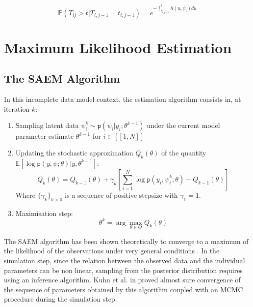 \documentclass[a4paper]{article}
\theoremstyle{plain}
\newcommand{\dens}{\texttt{p}}
\theoremstyle{plain}
\theoremstyle{definition}
\begin{document}
\begin{equation}
\mathbb{P}(T_{ij} > t|T_{i,j-1}=t_{i,j-1}) = e^{-\int_{t_{i,j-1}}^{t}h(u, \psi_i)du}
\end{equation}

\section{Maximum Likelihood Estimation}
\subsection{The SAEM Algorithm}\label{sec:saem_alg}
In this incomplete data model context, the estimation algorithm consists in, at iteration $k$:
\begin{enumerate}
\item Sampling latent data $\psi_i^k \sim \dens(\psi_i|y_i;\theta^{k-1})$ under the current model parameter estimate $\theta^{k-1}$ for $i \in [\![1,N]\!]$
\item Updating the stochastic approximation $Q_k(\theta)$ of the quantity $\mathbb{E}\left[\log \dens(y,\psi; \theta) | y, \theta^{k-1}\right]$:
\begin{equation}
Q_k(\theta) = Q_{k-1}(\theta) + \gamma_k\left[\sum_{i=1}^{N}{\log \dens(y_i,\psi_i^k; \theta)} - Q_{k-1}(\theta)\right]
\end{equation}
Where $\{\gamma_k\}_{k>0}$ is a sequence of positive stepsize with $\gamma_1 = 1$.
\item Maximisation step:
\begin{equation}
\theta^k = \arg \max \limits_{\theta \in \Theta} Q_k(\theta)
\end{equation}
\end{enumerate}


The SAEM algorithm has been shown theoretically to converge to a maximum of the likelihood of the observations under very general conditions \cite{lavielle}.
In the simulation step, since the relation between the observed data and the individual parameters can be non linear, sampling from the posterior distribution requires using an inference algorithm. Kuhn et al. in \cite{kuhn} proved almost sure convergence of the sequence of parameters obtained by this algorithm coupled with an MCMC procedure during the simulation step.
\end{document}
